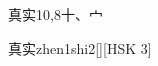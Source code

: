 \begin{entry}{真实}{10,8}{⼗、⼧}
  \begin{phonetics}{真实}{zhen1shi2}[][HSK 3]
  \end{phonetics}
\end{entry}
